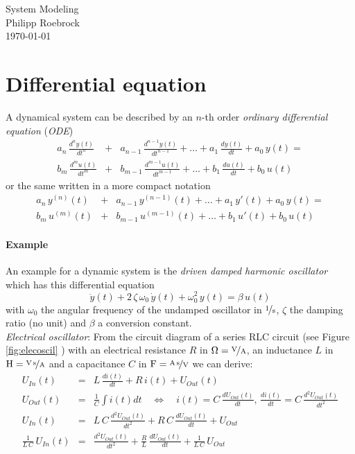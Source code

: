 \documentclass[a4paper,12pt]{article}
\newcommand{\FigRef}[1]{%
	Figure \ref{fig:#1}%
	}
\newcommand{\Section}[2]{\section{#2}\label{section:#1}}
\newcommand{\ELabel}[1]{\label{equation:#1}}
\begin{document}
\vspace{1.5cm}
\begin{center}
{\Huge System Modeling}\\[3ex]
Philipp Roebrock\\[1ex]
\today\\
\end{center}
\vspace{1cm}



\Section{diffeq}{Differential equation}

A dynamical system can be described by an $n$-th order {\em ordinary differential
equation} ({\em ODE})
\begin{eqnarray}
a_{n}\,\frac{d^{n}y(t)}{dt^{n}}&+&a_{n-1}\,\frac{d^{n-1}y(t)}{dt^{n-1}}+\ldots+a_{1}\,\frac{dy(t)}{dt}+a_{0}\,y(t)=\nonumber\\
b_{m}\,\frac{d^{m}u(t)}{dt^{m}}&+&b_{m-1}\,\frac{d^{m-1}u(t)}{dt^{m-1}}+\ldots+b_{1}\,\frac{du(t)}{dt}+b_{0}\,u(t)
\end{eqnarray}
or the same written in a more compact notation
\begin{eqnarray}
\ELabel{ode}
a_{n}\,y^{(n)}(t)&+&a_{n-1}\,y^{(n-1)}(t)+\ldots+a_{1}\,y'(t)+a_{0}\,y(t)=\nonumber\\
b_{m}\,u^{(m)}(t)&+&b_{m-1}\,u^{(m-1)}(t)+\ldots+b_{1}\,u'(t)+b_{0}\,u(t)
\end{eqnarray}

\paragraph{Example}

An example for a dynamic system is the {\em driven damped harmonic oscillator}
which has this differential equation
\begin{equation}
\ELabel{oscillatorode}
\ddot{y}(t)+2\,\zeta\,\omega_0\,\dot{y}(t)+\omega_0^2\,y(t)=\beta\,u(t)
\end{equation}
with $\omega_0$ the angular frequency of the undamped oscillator in
$\unitfrac{1}{s}$, $\zeta$ the damping ratio (no unit) and $\beta$ a
conversion constant.\\

{\em Electrical oscillator}: From the circuit diagram of a series RLC circuit
(see \FigRef{elecoscil}) with an electrical resistance $R$ in
$\unit{\Omega}=\unitfrac{V}{A}$, an inductance $L$ in $\unit{H}=\unitfrac{V\,s}{A}$
and a capacitance $C$ in $\unit{F}=\unitfrac{A\,s}{V}$ we can derive:
\begin{eqnarray}
U_{In}(t)&=&L\,\frac{di(t)}{dt}+R\,i(t)+U_{Out}(t)\\
U_{Out}(t)&=&\frac{1}{C}\int i(t)dt\quad\Leftrightarrow\quad i(t)=C\,\frac{dU_{Out}(t)}{dt},\,\frac{di(t)}{dt}=C\,\frac{d^2U_{Out}(t)}{dt^2}\\
U_{In}(t)&=&L\,C\,\frac{d^2U_{Out}(t)}{dt^2}+R\,C\,\frac{dU_{Out}(t)}{dt}+U_{Out}\\
\frac{1}{L\,C}\,U_{In}(t)&=&\frac{d^2U_{Out}(t)}{dt^2}+\frac{R}{L}\,\frac{dU_{Out}(t)}{dt}+\frac{1}{L\,C}\,U_{Out}\\
\end{eqnarray}
\end{document}
